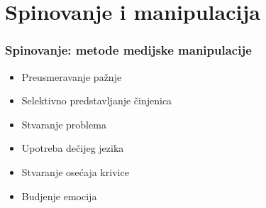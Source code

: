 \documentclass[13pt]{beamer}
\begin{document}
\section{Spinovanje i manipulacija}

\begin{frame}[fragile]\frametitle{Spinovanje: metode medijske manipulacije}
	\begin{itemize}	
		\item Preusmeravanje pažnje
		\item Selektivno predstavljanje činjenica
		\item Stvaranje problema
  	\item Upotreba dečijeg jezika
		\item Stvaranje osećaja krivice
		\item Budjenje emocija
	\end{itemize}
\end{frame}
\end{document}

